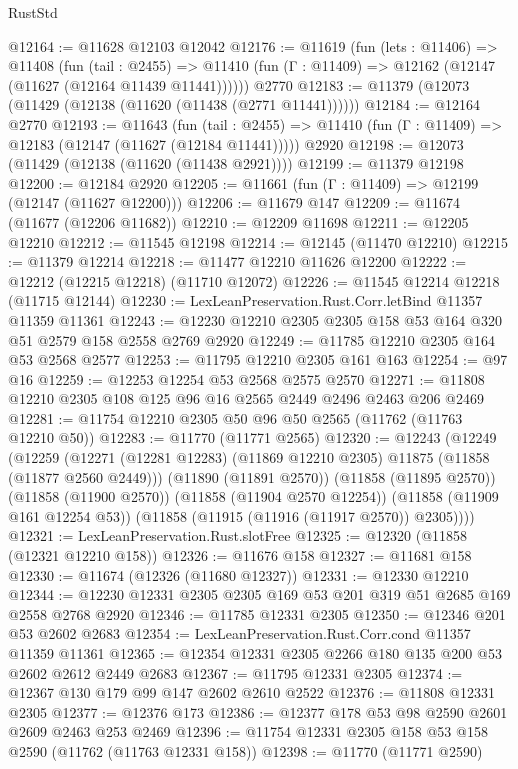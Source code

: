 \begin{lexlean}{RustStd}
\begin{coremodule}
@12164 := @11628 @12103 @12042
@12176 := @11619
    (fun (lets : @11406) =>
    @11408
      (fun (tail : @2455) =>
      @11410 (fun (Γ : @11409) => @12162 (@12147 (@11627 (@12164 @11439 @11441))))))
    @2770
@12183 := @11379 (@12073 (@11429 (@12138 (@11620 (@11438 (@2771 @11441))))))
@12184 := @12164 @2770
@12193 := @11643
    (fun (tail : @2455) => @11410 (fun (Γ : @11409) => @12183 (@12147 (@11627 (@12184 @11441)))))
    @2920
@12198 := @12073 (@11429 (@12138 (@11620 (@11438 @2921))))
@12199 := @11379 @12198
@12200 := @12184 @2920
@12205 := @11661 (fun (Γ : @11409) => @12199 (@12147 (@11627 @12200)))
@12206 := @11679 @147
@12209 := @11674 (@11677 (@12206 @11682))
@12210 := @12209 @11698
@12211 := @12205 @12210
@12212 := @11545 @12198
@12214 := @12145 (@11470 @12210)
@12215 := @11379 @12214
@12218 := @11477 @12210 @11626 @12200
@12222 := @12212 (@12215 @12218) (@11710 @12072)
@12226 := @11545 @12214 @12218 (@11715 @12144)
@12230 := LexLeanPreservation.Rust.Corr.letBind @11357 @11359 @11361
@12243 := @12230 @12210 @2305 @2305 @158 @53 @164 @320 @51 @2579 @158 @2558 @2769 @2920
@12249 := @11785 @12210 @2305 @164 @53 @2568 @2577
@12253 := @11795 @12210 @2305 @161 @163
@12254 := @97 @16
@12259 := @12253 @12254 @53 @2568 @2575 @2570
@12271 := @11808 @12210 @2305 @108 @125 @96 @16 @2565 @2449 @2496 @2463 @206 @2469
@12281 := @11754 @12210 @2305 @50 @96 @50 @2565 (@11762 (@11763 @12210 @50))
@12283 := @11770 (@11771 @2565)
@12320 := @12243
    (@12249
      (@12259
        (@12271 (@12281 @12283) (@11869 @12210 @2305) @11875 (@11858 (@11877 @2560 @2449)))
        (@11890 (@11891 @2570))
        (@11858 (@11895 @2570))
        (@11858 (@11900 @2570))
        (@11858 (@11904 @2570 @12254))
        (@11858 (@11909 @161 @12254 @53))
        (@11858 (@11915 (@11916 (@11917 @2570)) @2305))))
@12321 := LexLeanPreservation.Rust.slotFree
@12325 := @12320 (@11858 (@12321 @12210 @158))
@12326 := @11676 @158
@12327 := @11681 @158
@12330 := @11674 (@12326 (@11680 @12327))
@12331 := @12330 @12210
@12344 := @12230 @12331 @2305 @2305 @169 @53 @201 @319 @51 @2685 @169 @2558 @2768 @2920
@12346 := @11785 @12331 @2305
@12350 := @12346 @201 @53 @2602 @2683
@12354 := LexLeanPreservation.Rust.Corr.cond @11357 @11359 @11361
@12365 := @12354 @12331 @2305 @2266 @180 @135 @200 @53 @2602 @2612 @2449 @2683
@12367 := @11795 @12331 @2305
@12374 := @12367 @130 @179 @99 @147 @2602 @2610 @2522
@12376 := @11808 @12331 @2305
@12377 := @12376 @173
@12386 := @12377 @178 @53 @98 @2590 @2601 @2609 @2463 @253 @2469
@12396 := @11754 @12331 @2305 @158 @53 @158 @2590 (@11762 (@11763 @12331 @158))
@12398 := @11770 (@11771 @2590)

\end{coremodule}
\end{lexlean}
